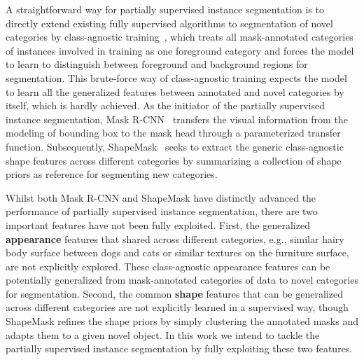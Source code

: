\documentclass[runningheads]{llncs}
\begin{document}
A straightforward way for partially supervised instance segmentation is to directly extend existing fully supervised algorithms to segmentation of novel categories by class-agnostic training~\cite{pinheiro2015learning,pinheiro2016learning}, which treats all mask-annotated categories of instances involved in training as one foreground category and forces the model to learn to distinguish between foreground and background regions for segmentation. This brute-force way of class-agnostic training expects the model to learn all the generalized features between annotated and novel categories by itself, which is hardly achieved. As the initiator of the partially supervised instance segmentation, Mask R-CNN~\cite{hu2018learning} transfers the visual information from the modeling of bounding box to the mask head through a parameterized transfer function. Subsequently, ShapeMask~\cite{kuo2019shapemask} seeks to extract the generic class-agnostic shape features across different categories by summarizing a collection of shape priors as reference for segmenting new categories. 

Whilst both Mask R-CNN and ShapeMask have distinctly advanced the performance of partially supervised instance segmentation, there are two important features have not been fully exploited. First, the generalized \textbf{appearance} features that shared across different categories, e.g., similar hairy body surface between dogs and cats or similar textures on the furniture surface, are not explicitly explored. These class-agnostic appearance features can be potentially generalized from mask-annotated categories of data to novel categories for segmentation. Second, the common \textbf{shape} features that can be generalized across different categories are not explicitly learned in a supervised way, though ShapeMask refines the shape priors by simply clustering the annotated masks and adapts them to a given novel object. In this work we intend to tackle the partially supervised instance segmentation by fully exploiting these two features. 
\end{document}
